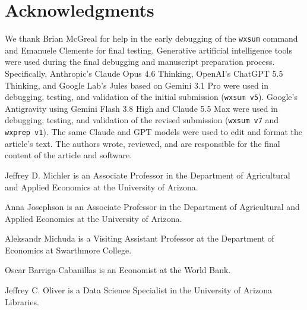 


\section*{Acknowledgments}
We thank Brian McGreal for help in the early debugging of the \texttt{wxsum} command and Emanuele Clemente for final testing. Generative artificial intelligence tools were used during the final debugging and manuscript preparation process. Specifically, Anthropic's Claude Opus 4.6 Thinking, OpenAI's ChatGPT 5.5 Thinking, and Google Lab's Jules based on Gemini 3.1 Pro were used in debugging, testing, and validation of the initial submission (\texttt{wxsum v5}). Google's Antigravity using Gemini Flash 3.8 High and Claude 5.5 Max were used in debugging, testing, and validation of the revised submission (\texttt{wxsum v7} and \texttt{wxprep v1}). The same Claude and GPT models were used to edit and format the article's text. The authors wrote, reviewed, and are responsible for the final content of the article and software.

\begin{aboutauthors}
Jeffrey D. Michler is an Associate Professor in the Department of Agricultural and Applied Economics at the University of Arizona.

Anna Josephson is an Associate Professor in the Department of Agricultural and Applied Economics at the University of Arizona.

Aleksandr Michuda is a Visiting Assistant Professor at the Department of Economics at Swarthmore College.

Oscar Barriga-Cabanillas is an Economist at the World Bank.

Jeffrey C. Oliver is a Data Science Specialist in the University of Arizona Libraries.

\end{aboutauthors}

\endinput
